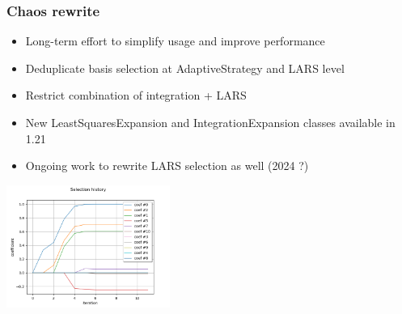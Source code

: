 \documentclass[aspectratio=169]{beamer}
\begin{document}

\begin{frame}
\frametitle{Chaos rewrite}
\begin{itemize}
\item Long-term effort to simplify usage and improve performance
\item Deduplicate basis selection at AdaptiveStrategy and LARS level
\item Restrict combination of integration + LARS
\item New LeastSquaresExpansion and IntegrationExpansion classes available in 1.21
\item Ongoing work to rewrite LARS selection as well (2024 ?)
\end{itemize}

% 

\begin{center}
\includegraphics[width=0.4\textwidth]{figures/lars}
\end{center}

\end{frame}

\end{document}
